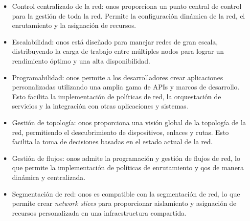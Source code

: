 \begin{itemize}
    \item  Control centralizado de la red: \gls{onos} proporciona un punto central de control para la gestión de toda la red. Permite la configuración dinámica de la red, el enrutamiento y la asignación de recursos.
    \item Escalabilidad: \gls{onos} está diseñado para manejar redes de gran escala, distribuyendo la carga de trabajo entre múltiples nodos para lograr un rendimiento óptimo y una alta disponibilidad.
    \item Programabilidad: \gls{onos} permite a los desarrolladores crear aplicaciones personalizadas utilizando una amplia gama de APIs y marcos de desarrollo. Esto facilita la implementación de políticas de red, la orquestación de servicios y la integración con otras aplicaciones y sistemas.
    \item Gestión de topología: \gls{onos} proporciona una visión global de la topología de la red, permitiendo el descubrimiento de dispositivos, enlaces y rutas. Esto facilita la toma de decisiones basadas en el estado actual de la red.
    \item Gestión de flujos: \gls{onos} admite la programación y gestión de flujos de red, lo que permite la implementación de políticas de enrutamiento y \gls{qos} de manera dinámica y centralizada.
    \item Segmentación de red: \gls{onos} es compatible con la segmentación de red, lo que permite crear \textit{network slices} para proporcionar aislamiento y asignación de recursos personalizada en una infraestructura compartida.
\end{itemize}

